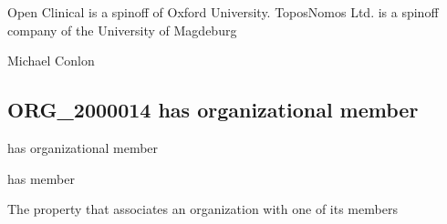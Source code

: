 \documentclass[letterpaper,10pt,english]{sphinxmanual}
\begin{document}
\begin{sphinxShadowBox}

\sphinxAtStartPar
Open Clinical is a spin\sphinxhyphen{}off of Oxford University. ToposNomos Ltd. is a spin\sphinxhyphen{}off company of the University of Magdeburg
\end{sphinxShadowBox}

\begin{sphinxShadowBox}

\sphinxAtStartPar
Michael Conlon 
\end{sphinxShadowBox}
\begin{quote}

\ignorespaces \end{quote}


\subsection{ORG\_2000014 \sphinxhyphen{} has organizational member}
\label{\detokenize{doc-ORG_2000014:org-2000014-has-organizational-member}}\label{\detokenize{doc-ORG_2000014:index-0}}\label{\detokenize{doc-ORG_2000014::doc}}
\begin{sphinxShadowBox}

\sphinxAtStartPar
has organizational member
\end{sphinxShadowBox}

\begin{sphinxShadowBox}

\sphinxAtStartPar
has member
\end{sphinxShadowBox}

\begin{sphinxShadowBox}

\sphinxAtStartPar
{}
\end{sphinxShadowBox}

\begin{sphinxShadowBox}

\sphinxAtStartPar
The property that associates an organization with one of its members
\end{sphinxShadowBox}
\end{document}
